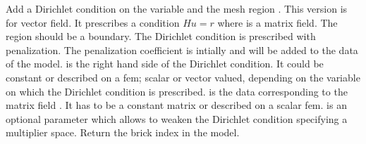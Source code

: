 \documentclass[a4paper,11pt,english]{sphinxmanual}
\begin{document}
\begin{fulllineitems}
\begin{fulllineitems}
\label{\detokenize{python/cmdref_Model:getfem.Model.add_generalized_Dirichlet_condition_with_penalization}}
Add a Dirichlet condition on the variable  and the mesh
region . This version is for vector field.
It prescribes a condition \(Hu = r\)
where  is a matrix field.
The region should be a boundary. The Dirichlet
condition is prescribed with penalization. The penalization coefficient
is intially  and will be added to the data of the model.
 is the right hand side of the Dirichlet condition.
It could be constant or described on a fem; scalar or vector valued,
depending on the variable on which the Dirichlet condition is prescribed.
 is the data
corresponding to the matrix field . It has to be a constant matrix
or described on a scalar fem.
 is an optional parameter which allows to weaken the
Dirichlet condition specifying a multiplier space.
Return the brick index in the model.

\end{fulllineitems}



\end{fulllineitems}
\end{document}
